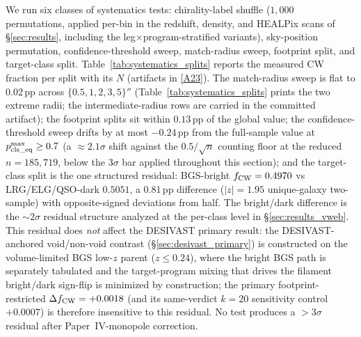 \documentclass[aps,prd,twocolumn,superscriptaddress,showpacs,preprintnumbers,nofootinbib,longbibliography,floatfix]{revtex4-2}
\newcommand{\repoBase}{https://github.com/Hubify-Projects/bigbounce/blob/main}
\begin{document}
We run six classes of systematics tests:
chirality-label shuffle ($1{,}000$ permutations, applied per-bin in
the redshift, density, and HEALPix scans of
\S\ref{sec:results}, including the leg$\times$program-stratified
variants), sky-position
permutation, confidence-threshold sweep, match-radius sweep,
footprint split, and target-class split.
Table~\ref{tab:systematics_splits} reports the measured CW fraction
per split with its $N$ (artifacts in
\href{\repoBase/pipelines/p5\_desi\_chirality/results/analysis\_systematics/}{[A23]}).
The match-radius sweep is flat to $0.02$\,pp across
$\{0.5, 1, 2, 3, 5\}''$
(Table~\ref{tab:systematics_splits} prints the two extreme radii;
the intermediate-radius rows are carried in the committed artifact);
the footprint splits sit within $0.13$\,pp
of the global value; the confidence-threshold sweep drifts by at most
$-0.24$\,pp from the full-sample value at
$p_{\rm cls\_eq}^{\max} \ge 0.7$ (a ${\approx}2.1\sigma$ shift
against the $0.5/\sqrt{n}$ counting floor at the reduced
$n = 185{,}719$, below the $3\sigma$ bar applied throughout this
section); and the target-class split is the one structured
residual: BGS-bright $f_{\rm CW} = 0.4970$ vs LRG/ELG/QSO-dark
$0.5051$, a $0.81$\,pp difference ($|z| = 1.95$ unique-galaxy two-sample) with
opposite-signed deviations from half. The bright/dark
difference is the $\sim\!2\sigma$ residual structure analyzed at the
per-class level in \S\ref{sec:results_vweb}. This residual does
\emph{not} affect the DESIVAST primary result: the DESIVAST-anchored
void/non-void contrast (\S\ref{sec:desivast_primary}) is constructed
on the volume-limited BGS low-$z$ parent ($z \leq 0.24$), where the
bright BGS path is separately tabulated and the target-program mixing
that drives the filament bright/dark sign-flip is minimized by
construction; the primary footprint-restricted
$\Delta f_{\rm CW} = +0.0018$ (and its same-verdict $k\!=\!20$
sensitivity control $+0.0007$) is therefore
insensitive to this residual. No test produces a
$>3\sigma$ residual after
Paper~IV-monopole correction.
\end{document}
